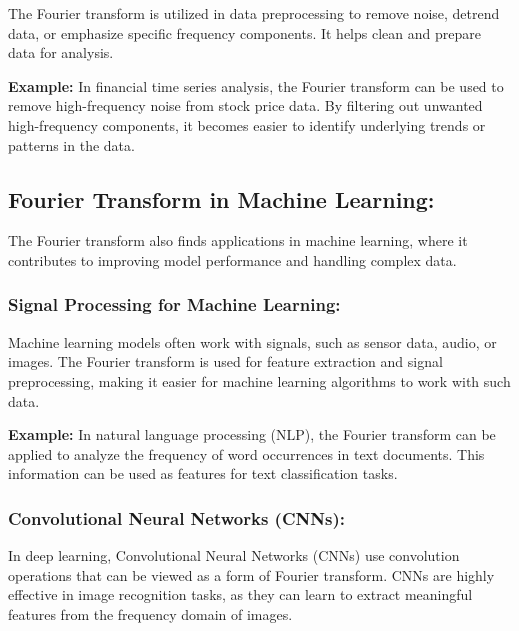 \documentclass[11pt]{article}
\begin{document}
The Fourier transform is utilized in data preprocessing to remove noise,
detrend data, or emphasize specific frequency components. It helps clean
and prepare data for analysis.

\textbf{Example:} In financial time series analysis, the Fourier
transform can be used to remove high-frequency noise from stock price
data. By filtering out unwanted high-frequency components, it becomes
easier to identify underlying trends or patterns in the data.

\hypertarget{fourier-transform-in-machine-learning}{%
\subsection{Fourier Transform in Machine
Learning:}\label{fourier-transform-in-machine-learning}}

The Fourier transform also finds applications in machine learning, where
it contributes to improving model performance and handling complex data.

\hypertarget{signal-processing-for-machine-learning}{%
\subsubsection{\texorpdfstring{\textbf{Signal Processing for Machine
Learning:}}{Signal Processing for Machine Learning:}}\label{signal-processing-for-machine-learning}}

Machine learning models often work with signals, such as sensor data,
audio, or images. The Fourier transform is used for feature extraction
and signal preprocessing, making it easier for machine learning
algorithms to work with such data.

\textbf{Example:} In natural language processing (NLP), the Fourier
transform can be applied to analyze the frequency of word occurrences in
text documents. This information can be used as features for text
classification tasks.

\hypertarget{convolutional-neural-networks-cnns}{%
\subsubsection{\texorpdfstring{\textbf{Convolutional Neural Networks
(CNNs):}}{Convolutional Neural Networks (CNNs):}}\label{convolutional-neural-networks-cnns}}

In deep learning, Convolutional Neural Networks (CNNs) use convolution
operations that can be viewed as a form of Fourier transform. CNNs are
highly effective in image recognition tasks, as they can learn to
extract meaningful features from the frequency domain of images.
\end{document}
